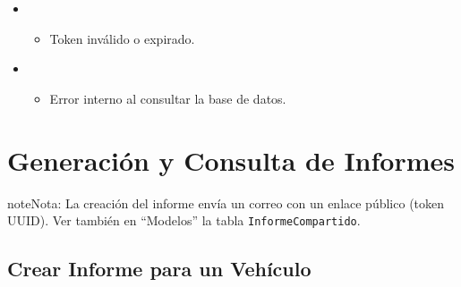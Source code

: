 \documentclass[a4paper,11pt,spanish]{sphinxmanual}
\newcommand{\robotoMonoBold}{\fontseries{b}\selectfont\ttfamily}
\renewcommand{\sphinxcode}[1]{\textcolor{sphinxorangeCode}{{\robotoMonoBold #1}}}
\renewcommand{\sphinxupquote}[1]{\texttt{#1}}
\begin{document}
\begin{fulllineitems}
\begin{itemize}
\begin{sphinxVerbatim}[commandchars=\\\{\}]
\end{sphinxVerbatim}

\item {} 
\sphinxAtStartPar
{}
\begin{itemize}
\item {} 
\sphinxAtStartPar
Token inválido o expirado.

\end{itemize}

\item {} 
\sphinxAtStartPar
{}
\begin{itemize}
\item {} 
\sphinxAtStartPar
Error interno al consultar la base de datos.

\end{itemize}

\end{itemize}

\end{fulllineitems}



\section{Generación y Consulta de Informes}
\label{\detokenize{endpoints:generacion-y-consulta-de-informes}}
\begin{sphinxadmonition}{note}{Nota:}
\sphinxAtStartPar
La creación del informe envía un correo con un enlace público (token UUID).
Ver también en “Modelos” la tabla \sphinxcode{\sphinxupquote{InformeCompartido}}.
\end{sphinxadmonition}


\subsection{Crear Informe para un Vehículo}
\label{\detokenize{endpoints:crear-informe-para-un-vehiculo}}
\end{document}
